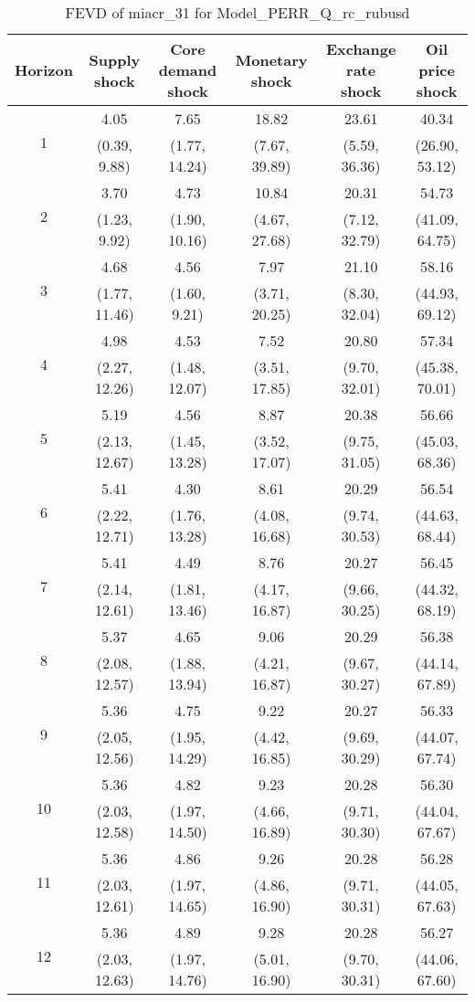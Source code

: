 \documentclass{article}
\begin{document}
\begin{table}
	\footnotesize
	\caption{FEVD of miacr_31 for Model_PERR_Q_rc_rubusd}
	\begin{tabular}{cccccc}
		Horizon & Supply shock & Core demand shock & Monetary shock & Exchange rate shock & Oil price shock\\ \hline
		\multirow{2}{*}{1} & 4.05 & 7.65 & 18.82 & 23.61 & 40.34\\
		 & (0.39, 9.88) & (1.77, 14.24) & (7.67, 39.89) & (5.59, 36.36) & (26.90, 53.12)\\
		\multirow{2}{*}{2} & 3.70 & 4.73 & 10.84 & 20.31 & 54.73\\
		 & (1.23, 9.92) & (1.90, 10.16) & (4.67, 27.68) & (7.12, 32.79) & (41.09, 64.75)\\
		\multirow{2}{*}{3} & 4.68 & 4.56 & 7.97 & 21.10 & 58.16\\
		 & (1.77, 11.46) & (1.60, 9.21) & (3.71, 20.25) & (8.30, 32.04) & (44.93, 69.12)\\
		\multirow{2}{*}{4} & 4.98 & 4.53 & 7.52 & 20.80 & 57.34\\
		 & (2.27, 12.26) & (1.48, 12.07) & (3.51, 17.85) & (9.70, 32.01) & (45.38, 70.01)\\
		\multirow{2}{*}{5} & 5.19 & 4.56 & 8.87 & 20.38 & 56.66\\
		 & (2.13, 12.67) & (1.45, 13.28) & (3.52, 17.07) & (9.75, 31.05) & (45.03, 68.36)\\
		\multirow{2}{*}{6} & 5.41 & 4.30 & 8.61 & 20.29 & 56.54\\
		 & (2.22, 12.71) & (1.76, 13.28) & (4.08, 16.68) & (9.74, 30.53) & (44.63, 68.44)\\
		\multirow{2}{*}{7} & 5.41 & 4.49 & 8.76 & 20.27 & 56.45\\
		 & (2.14, 12.61) & (1.81, 13.46) & (4.17, 16.87) & (9.66, 30.25) & (44.32, 68.19)\\
		\multirow{2}{*}{8} & 5.37 & 4.65 & 9.06 & 20.29 & 56.38\\
		 & (2.08, 12.57) & (1.88, 13.94) & (4.21, 16.87) & (9.67, 30.27) & (44.14, 67.89)\\
		\multirow{2}{*}{9} & 5.36 & 4.75 & 9.22 & 20.27 & 56.33\\
		 & (2.05, 12.56) & (1.95, 14.29) & (4.42, 16.85) & (9.69, 30.29) & (44.07, 67.74)\\
		\multirow{2}{*}{10} & 5.36 & 4.82 & 9.23 & 20.28 & 56.30\\
		 & (2.03, 12.58) & (1.97, 14.50) & (4.66, 16.89) & (9.71, 30.30) & (44.04, 67.67)\\
		\multirow{2}{*}{11} & 5.36 & 4.86 & 9.26 & 20.28 & 56.28\\
		 & (2.03, 12.61) & (1.97, 14.65) & (4.86, 16.90) & (9.71, 30.31) & (44.05, 67.63)\\
		\multirow{2}{*}{12} & 5.36 & 4.89 & 9.28 & 20.28 & 56.27\\
		 & (2.03, 12.63) & (1.97, 14.76) & (5.01, 16.90) & (9.70, 30.31) & (44.06, 67.60)\\
	\end{tabular}
\label{tab:fevd-Model_PERR_Q_rc_rubusd-miacr_31}
\end{table}
\end{document}
